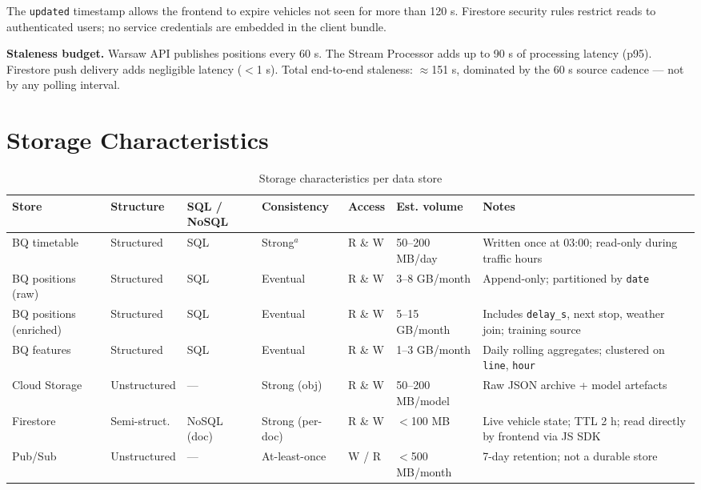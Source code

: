 \documentclass[11pt,a4paper]{article}
\newcommand{\hd}[1]{\textbf{\small #1}}
\begin{document}
The \texttt{updated} timestamp allows the frontend to expire vehicles not seen
for more than 120 s. Firestore security rules restrict reads to authenticated
users; no service credentials are embedded in the client bundle.

\textbf{Staleness budget.}
Warsaw API publishes positions every 60 s.
The Stream Processor adds up to 90 s of processing latency (p95).
Firestore push delivery adds negligible latency ($<$1 s).
Total end-to-end staleness: $\approx$151 s, dominated by the 60 s source
cadence --- not by any polling interval.

\section{Storage Characteristics}


\begin{table}[H]
\centering
\caption{Storage characteristics per data store}
\renewcommand{\arraystretch}{1.48}
\begin{tabularx}{\linewidth}{L{2.2cm} L{1.6cm} L{1.8cm} L{2.2cm} L{1.6cm} L{2.0cm} X}
\toprule
\hd{Store} & \hd{Structure} & \hd{SQL / NoSQL} & \hd{Consistency} & \hd{Access} & \hd{Est. volume} & \hd{Notes} \\
\midrule
{}
BQ timetable & Structured & SQL & Strong$^{a}$ & R \& W & 50--200 MB/day & Written once at 03:00; read-only during traffic hours \\
BQ positions (raw) & Structured & SQL & Eventual & R \& W & 3--8 GB/month & Append-only; partitioned by \texttt{date} \\
BQ positions (enriched) & Structured & SQL & Eventual & R \& W & 5--15 GB/month & Includes \texttt{delay\_s}, next stop, weather join; training source \\
BQ features & Structured & SQL & Eventual & R \& W & 1--3 GB/month & Daily rolling aggregates; clustered on \texttt{line}, \texttt{hour} \\
Cloud Storage & Unstructured & --- & Strong (obj) & R \& W & 50--200 MB/model & Raw JSON archive + model artefacts \\
Firestore & Semi-struct. & NoSQL (doc) & Strong (per-doc) & R \& W & $<$100 MB & Live vehicle state; TTL 2 h; read directly by frontend via JS SDK \\
Pub/Sub & Unstructured & --- & At-least-once & W / R & $<$500 MB/month & 7-day retention; not a durable store \\
\bottomrule
\end{tabularx}
\end{table}
\end{document}
